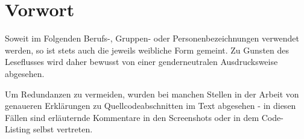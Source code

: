 \documentclass[
	12pt,
	BCOR=10mm,1
	headinclude=on,
	footinclude=off,
	parskip=half,
	bibliography=totoc,
	listof=entryprefix,
	toc=listof, 
	pointlessnumbers,
	plainfootsepline]{scrreprt}
\begin{document}


\normalfont


\chapter*{Vorwort}
Soweit im Folgenden Berufs-, Gruppen- oder Personenbezeichnungen verwendet werden, so ist stets auch die jeweils weibliche Form gemeint. Zu Gunsten des Leseflusses wird daher bewusst von einer genderneutralen Ausdrucksweise abgesehen.
\par
Um Redundanzen zu vermeiden, wurden bei manchen Stellen in der Arbeit von genaueren Erklärungen zu Quellcodeabschnitten im Text abgesehen - in diesen Fällen sind erläuternde Kommentare in den Screenshots oder in dem Code-Listing selbst vertreten.


\tableofcontents

\listoffigures


\lstlistoflistings 




\clearpage 
\ihead{\chaptername~\thechapter} %



\ihead{} %
\printbibliography	

\appendix
\ihead{\appendixname~\thechapter} %




\end{document}
